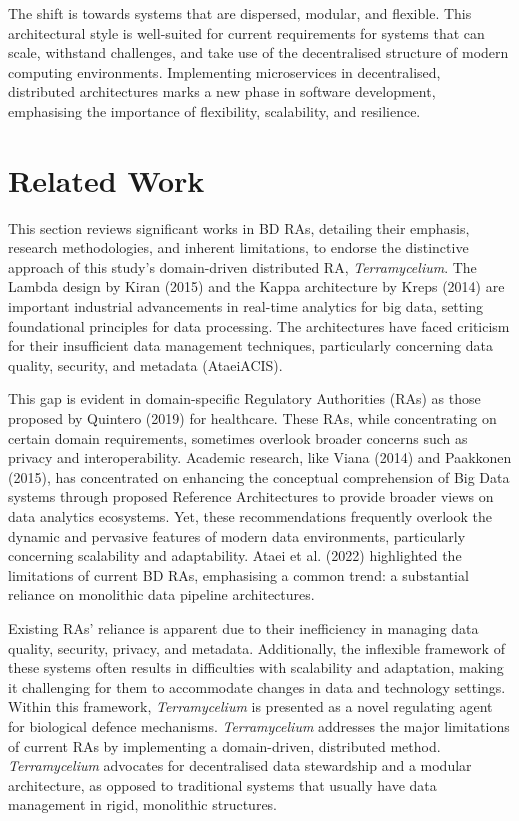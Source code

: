\documentclass[journal]{IEEEtran}
\begin{document}
The shift is towards systems that are dispersed, modular, and flexible. This architectural style is well-suited for current requirements for systems that can scale, withstand challenges, and take use of the decentralised structure of modern computing environments. Implementing microservices in decentralised, distributed architectures marks a new phase in software development, emphasising the importance of flexibility, scalability, and resilience.


\section{Related Work}
\label{sec:related_work}

This section reviews significant works in BD RAs, detailing their emphasis, research methodologies, and inherent limitations, to endorse the distinctive approach of this study's domain-driven distributed RA, \textit{Terramycelium}. The Lambda design by Kiran (2015) and the Kappa architecture by Kreps (2014) are important industrial advancements in real-time analytics for big data, setting foundational principles for data processing. The architectures have faced criticism for their insufficient data management techniques, particularly concerning data quality, security, and metadata (AtaeiACIS). 

This gap is evident in domain-specific Regulatory Authorities (RAs) as those proposed by Quintero (2019) for healthcare. These RAs, while concentrating on certain domain requirements, sometimes overlook broader concerns such as privacy and interoperability. Academic research, like Viana (2014) and Paakkonen (2015), has concentrated on enhancing the conceptual comprehension of Big Data systems through proposed Reference Architectures to provide broader views on data analytics ecosystems. Yet, these recommendations frequently overlook the dynamic and pervasive features of modern data environments, particularly concerning scalability and adaptability. Ataei et al. (2022) highlighted the limitations of current BD RAs, emphasising a common trend: a substantial reliance on monolithic data pipeline architectures. 

Existing RAs' reliance is apparent due to their inefficiency in managing data quality, security, privacy, and metadata. Additionally, the inflexible framework of these systems often results in difficulties with scalability and adaptation, making it challenging for them to accommodate changes in data and technology settings. Within this framework, \textit{Terramycelium} is presented as a novel regulating agent for biological defence mechanisms. \textit{Terramycelium} addresses the major limitations of current RAs by implementing a domain-driven, distributed method. \textit{Terramycelium} advocates for decentralised data stewardship and a modular architecture, as opposed to traditional systems that usually have data management in rigid, monolithic structures. 
\end{document}
